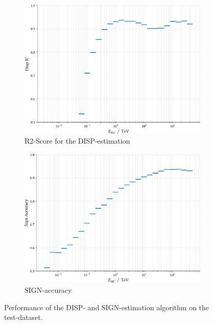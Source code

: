 \begin{figure}
    \begin{subfigure}{0.45\textwidth}
        \includegraphics[width=0.9\linewidth]{../analysis/plots/disp_test_r2_equal_sized.pdf} 
        \caption{R2-Score for the DISP-estimation}
    \end{subfigure}
    \begin{subfigure}{0.45\textwidth}
        \includegraphics[width=0.9\linewidth]{../analysis/plots/disp_test_acc_equal_sized.pdf}
        \caption{SIGN-accuracy}
    \end{subfigure}
    \caption{Performance of the DISP- and SIGN-estimation algorithm on the test-dataset.}
    \label{fig:disp_test_perf}
\end{figure}

